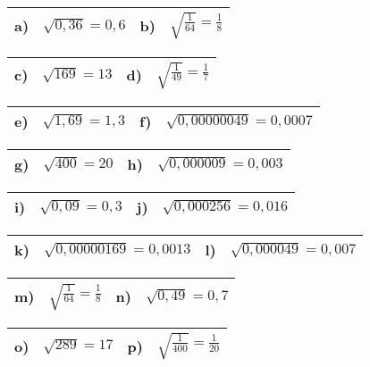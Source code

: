\documentclass[12pt]{article}
\begin{document}
\begin{tabularx}{\textwidth}{|C{1.0cm}|X|C{1.0cm}|X|}
\hline
a)&{$\sqrt{0,36}=0,6$}
&
b)&{$\sqrt{\frac{1}{64}}=\frac{1}{8}$}
\\\hline
\end{tabularx}
\vspace{0.5cm}
\begin{tabularx}{\textwidth}{|C{1.0cm}|X|C{1.0cm}|X|}
\hline
c)&{$\sqrt{169}=13$}
&
d)&{$\sqrt{\frac{1}{49}}=\frac{1}{7}$}
\\\hline
\end{tabularx}
\vspace{0.5cm}
\begin{tabularx}{\textwidth}{|C{1.0cm}|X|C{1.0cm}|X|}
\hline
e)&{$\sqrt{1,69}=1,3$}
&
f)&{$\sqrt{0,00000049}=0,0007$}
\\\hline
\end{tabularx}
\vspace{0.5cm}
\begin{tabularx}{\textwidth}{|C{1.0cm}|X|C{1.0cm}|X|}
\hline
g)&{$\sqrt{400}=20$}
&
h)&{$\sqrt{0,000009}=0,003$}
\\\hline
\end{tabularx}
\vspace{0.5cm}
\begin{tabularx}{\textwidth}{|C{1.0cm}|X|C{1.0cm}|X|}
\hline
i)&{$\sqrt{0,09}=0,3$}
&
j)&{$\sqrt{0,000256}=0,016$}
\\\hline
\end{tabularx}
\vspace{0.5cm}
\begin{tabularx}{\textwidth}{|C{1.0cm}|X|C{1.0cm}|X|}
\hline
k)&{$\sqrt{0,00000169}=0,0013$}
&
l)&{$\sqrt{0,000049}=0,007$}
\\\hline
\end{tabularx}
\vspace{0.5cm}
\begin{tabularx}{\textwidth}{|C{1.0cm}|X|C{1.0cm}|X|}
\hline
m)&{$\sqrt{\frac{1}{64}}=\frac{1}{8}$}
&
n)&{$\sqrt{0,49}=0,7$}
\\\hline
\end{tabularx}
\vspace{0.5cm}
\begin{tabularx}{\textwidth}{|C{1.0cm}|X|C{1.0cm}|X|}
\hline
o)&{$\sqrt{289}=17$}
&
p)&{$\sqrt{\frac{1}{400}}=\frac{1}{20}$}
\\\hline
\end{tabularx}
\end{document}
